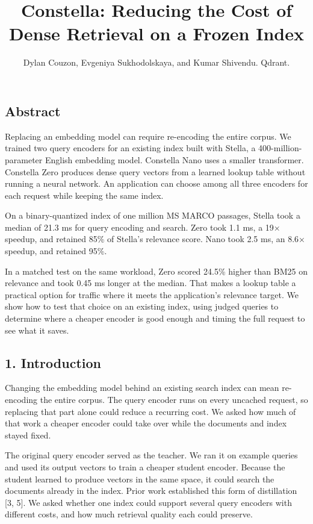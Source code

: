\documentclass[
  english,
  10pt,
]{article}
\title{Constella: Reducing the Cost of Dense Retrieval on a Frozen
Index}
\author{Dylan Couzon, Evgeniya Sukhodolskaya, and Kumar Shivendu.
Qdrant.}
\date{}
\begin{document}
\maketitle

\subsection{Abstract}\label{abstract}

Replacing an embedding model can require re-encoding the entire corpus.
We trained two query encoders for an existing index built with Stella, a
400-million-parameter English embedding model. Constella Nano uses a
smaller transformer. Constella Zero produces dense query vectors from a
learned lookup table without running a neural network. An application
can choose among all three encoders for each request while keeping the
same index.

On a binary-quantized index of one million MS MARCO passages, Stella
took a median of 21.3 ms for query encoding and search. Zero took 1.1
ms, a 19× speedup, and retained 85\% of Stella's relevance score. Nano
took 2.5 ms, an 8.6× speedup, and retained 95\%.

In a matched test on the same workload, Zero scored 24.5\% higher than
BM25 on relevance and took 0.45 ms longer at the median. That makes a
lookup table a practical option for traffic where it meets the
application's relevance target. We show how to test that choice on an
existing index, using judged queries to determine where a cheaper
encoder is good enough and timing the full request to see what it saves.

\subsection{1. Introduction}\label{introduction}

Changing the embedding model behind an existing search index can mean
re-encoding the entire corpus. The query encoder runs on every uncached
request, so replacing that part alone could reduce a recurring cost. We
asked how much of that work a cheaper encoder could take over while the
documents and index stayed fixed.

The original query encoder served as the teacher. We ran it on example
queries and used its output vectors to train a cheaper student encoder.
Because the student learned to produce vectors in the same space, it
could search the documents already in the index. Prior work established
this form of distillation {[}3, 5{]}. We asked whether one index could
support several query encoders with different costs, and how much
retrieval quality each could preserve.
\end{document}
